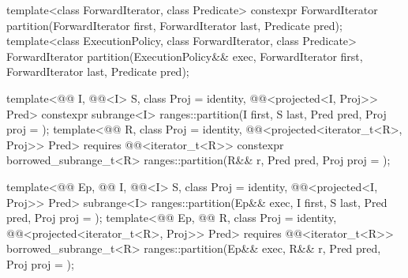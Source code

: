 %
\begin{itemdecl}
template<class ForwardIterator, class Predicate>
  constexpr ForwardIterator
    partition(ForwardIterator first, ForwardIterator last, Predicate pred);
template<class ExecutionPolicy, class ForwardIterator, class Predicate>
  ForwardIterator
    partition(ExecutionPolicy&& exec, ForwardIterator first, ForwardIterator last, Predicate pred);

template<@@ I, @@<I> S, class Proj = identity,
         @@<projected<I, Proj>> Pred>
  constexpr subrange<I>
    ranges::partition(I first, S last, Pred pred, Proj proj = {});
template<@@ R, class Proj = identity,
         @@<projected<iterator_t<R>, Proj>> Pred>
  requires @@<iterator_t<R>>
  constexpr borrowed_subrange_t<R>
    ranges::partition(R&& r, Pred pred, Proj proj = {});

template<@@ Ep, @@ I, @@<I> S,
         class Proj = identity, @@<projected<I, Proj>> Pred>
  subrange<I> ranges::partition(Ep&& exec, I first, S last, Pred pred, Proj proj = {});
template<@@ Ep, @@ R, class Proj = identity,
         @@<projected<iterator_t<R>, Proj>> Pred>
  requires @@<iterator_t<R>>
  borrowed_subrange_t<R> ranges::partition(Ep&& exec, R&& r, Pred pred, Proj proj = {});
\end{itemdecl}


